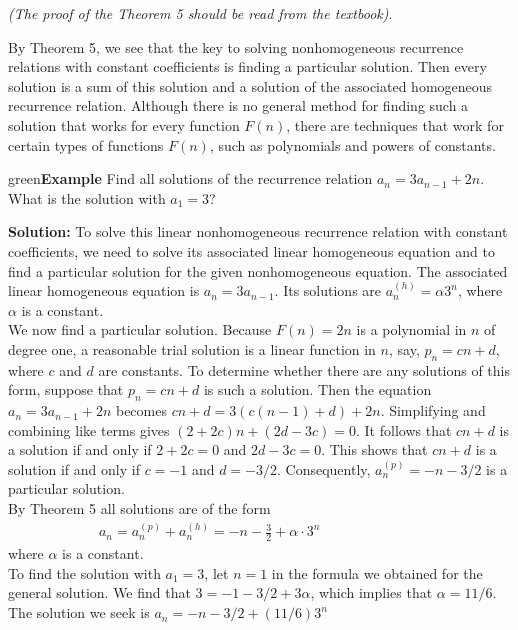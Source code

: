 \documentclass[11pt]{article}
\newenvironment{example}[1][\unskip]{\begin{mybox}{green}{\textbf{Example} {#1}}}{\end{mybox}}
\begin{document}
\textit{(The proof of the Theorem 5 should be read from the textbook)}.

By Theorem 5, we see that the key to solving nonhomogeneous recurrence relations with constant coefficients is finding a particular solution. Then every solution is a sum of this solution and a solution of the associated homogeneous recurrence relation. Although there is no general method for finding such a solution that works for every function $F(n)$, there are techniques that work for certain types of functions $F(n)$, such as polynomials and powers of constants.

\begin{example}
Find all solutions of the recurrence relation $a_n = 3a_{n-1} + 2n$. What is the solution with $a_1 = 3$?

\textbf{Solution:}
To solve this linear nonhomogeneous recurrence relation with constant coefficients, we need to solve its associated linear homogeneous equation and to find a particular solution for the given nonhomogeneous equation. The associated linear homogeneous equation is $a_n = 3a_{n-1}$. Its solutions are $a_n^{(h)} = \alpha 3^n$, where $\alpha$ is a constant.\\

We now find a particular solution. Because $F(n) = 2n$ is a polynomial in $n$ of degree one, a reasonable trial solution is a linear function in $n$, say, $p_n = cn + d$, where $c$ and $d$ are constants. To determine whether there are any solutions of this form, suppose that $p_n = cn + d$ is such a solution. Then the equation $a_n = 3a_{n-1} + 2n$ becomes $cn + d = 3(c(n - 1) + d) + 2n$. Simplifying and combining like terms gives $(2 + 2c)n+ (2d - 3c) = 0$. It follows that $cn + d$ is a solution if and only if $2 + 2c = 0$ and $2d - 3c = 0$. This shows that $cn + d$ is a solution if and only if $c = -1$ and $d = -3/2$. Consequently, $a_n^{(p)} = -n - 3/2$ is a particular solution.\\

By Theorem 5 all solutions are of the form
\begin{align*}
    a_n = a_n^{(p)} + a_n^{(h)} = -n - \frac{3}{2} + \alpha \cdot 3^n & & & & & & & &  &
\end{align*}
where $\alpha$ is a constant.\\

To find the solution with $a_1 = 3$, let $n = 1$ in the formula we obtained for the general solution. We find that $3 = -1 - 3/2 + 3\alpha$, which implies that $\alpha = 11/6$. The solution we seek is $a_n = -n - 3/2 + (11/6)3^n$
\end{example}
\end{document}
